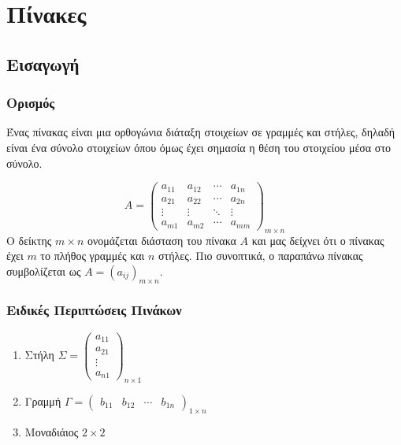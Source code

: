 







\chapter{Πίνακες}

\section{Εισαγωγή}

\subsection{Ορισμός}

Ένας πίνακας είναι μια ορθογώνια διάταξη στοιχείων σε γραμμές και στήλες,
δηλαδή είναι ένα σύνολο στοιχείων όπου όμως έχει σημασία η θέση του στοιχείου
μέσα στο σύνολο.

\[
  A = \begin{pmatrix*}
    a_{11} & a_{12} & \cdots & a_{1n} \\
    a_{21} & a_{22} & \cdots & a_{2n} \\
    \vdots & \vdots & \ddots & \vdots \\
    a_{m1} & a_{m2} & \cdots & a_{mm}
  \end{pmatrix*}_{m\times n} 
\] 
Ο δείκτης $ m\times n $ ονομάζεται διάσταση του πίνακα $ A $ και μας δείχνει ότι
ο πίνακας έχει $ m $ το πλήθος γραμμές και $n$ στήλες.
Πιο συνοπτικά, ο παραπάνω πίνακας συμβολίζεται ως $ A = (a_{ij})_{m\times n} $.


\subsection{Ειδικές Περιπτώσεις Πινάκων}


\begin{enumerate}
  \item  Στήλη $ \Sigma = \begin{pmatrix}
      a_{11} \\
      a_{21} \\
      \vdots \\
      a_{n1}
    \end{pmatrix}_{n\times 1}$

  \item  Γραμμή $ \Gamma  = \begin{pmatrix}
      b_{11} & b_{12} & \cdots & b_{1n}
    \end{pmatrix}_{1\times n} $

  \item Μοναδιάιος $ 2\times 2 $ 
\end{enumerate}



